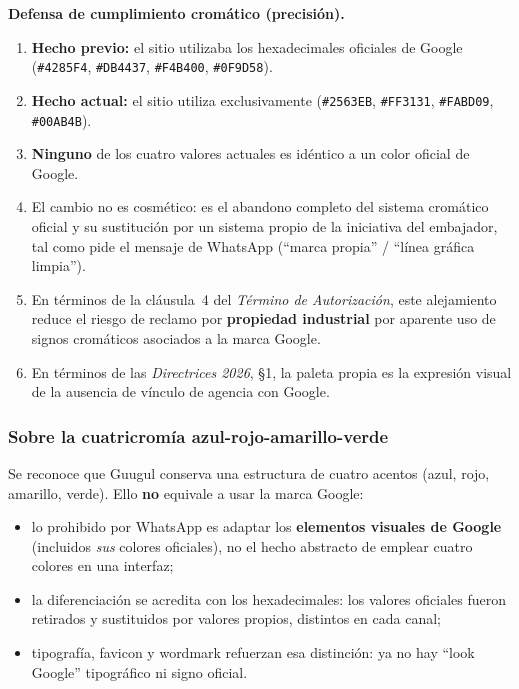 \documentclass[11pt,a4paper]{article}
\begin{document}
\begin{cumplbox}
\noindent\textbf{Defensa de cumplimiento cromático (precisión).}\\[0.3em]
\begin{enumerate}[leftmargin=*,nosep]
  \item \textbf{Hecho previo:} el sitio utilizaba los hexadecimales oficiales de Google (\texttt{\#4285F4}, \texttt{\#DB4437}, \texttt{\#F4B400}, \texttt{\#0F9D58}).
  \item \textbf{Hecho actual:} el sitio utiliza exclusivamente (\texttt{\#2563EB}, \texttt{\#FF3131}, \texttt{\#FABD09}, \texttt{\#00AB4B}).
  \item \textbf{Ninguno} de los cuatro valores actuales es idéntico a un color oficial de Google.
  \item El cambio no es cosmético: es el abandono completo del sistema cromático oficial y su sustitución por un sistema propio de la iniciativa del embajador, tal como pide el mensaje de WhatsApp (\enquote{marca propia} / \enquote{línea gráfica limpia}).
  \item En términos de la cláusula~4 del \emph{Término de Autorización}, este alejamiento reduce el riesgo de reclamo por \textbf{propiedad industrial} por aparente uso de signos cromáticos asociados a la marca Google.
  \item En términos de las \emph{Directrices 2026}, §1, la paleta propia es la expresión visual de la ausencia de vínculo de agencia con Google.
\end{enumerate}
\end{cumplbox}

\subsubsection{Sobre la cuatricromía azul-rojo-amarillo-verde}

Se reconoce que Guugul conserva una estructura de cuatro acentos (azul, rojo, amarillo, verde). Ello \textbf{no} equivale a usar la marca Google:

\begin{itemize}[leftmargin=*]
  \item lo prohibido por WhatsApp es adaptar los \textbf{elementos visuales de Google} (incluidos \emph{sus} colores oficiales), no el hecho abstracto de emplear cuatro colores en una interfaz;
  \item la diferenciación se acredita con los hexadecimales: los valores oficiales fueron retirados y sustituidos por valores propios, distintos en cada canal;
  \item tipografía, favicon y wordmark refuerzan esa distinción: ya no hay \enquote{look Google} tipográfico ni signo oficial.
\end{itemize}
\end{document}

